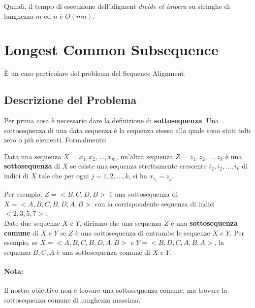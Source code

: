 Quindi, il tempo di esecuzione dell'aligment \emph{divide et impera} su
stringhe di lunghezza $m$ ed $n$ è $O(mn)$.

\section{Longest Common Subsequence}

È un caso particolare del problema del Sequence Alignment.

\subsection{Descrizione del Problema}

Per prima cosa è necessario dare la definizione di
\textbf{sottosequenza}. Una sottosequenza di una data sequenza è la
sequenza stessa alla quale sono stati tolti zero o più elementi.
Formalmente:\\

\begin{minipage}{\textwidth}
	\begin{myblockquote}
		Data una sequenza $X$ =
		$x_1, x_2, ..., x_m$, un'altra sequenza $Z$ = $z_1, z_2, ..., z_k$
		è una \textbf{sottosequenza} di $X$ se esiste una sequenza
		strettamente crescente $i_2, i_2, ..., i_k$ di indici di $X$ tale
		che per ogni $j = 1, 2, ..., k$, si ha $x_{i_j} = z_j$.
	\end{myblockquote}
\end{minipage}

Per esempio, $Z = <B, C, D, B>$ è una sottosequenza di
$X = < A, B, C, B, D, A, B>$ con la corrispondente sequenza di indici
$<2, 3, 5, 7>$.\\

Date due sequenze $X$ e $Y$, diciamo che una sequenza $Z$ è una
\textbf{sottosequenza comune} di $X$ e $Y$ se $Z$ è una
sottosequenza di entrambe le sequenze $X$ e $Y$. Per esempio, se
$X = <A,B,C,B,D,A,B>$ e $Y = <B,D,C,A,B,A>$, la sequenza $B,C,A$ è
una sottosequenza comune di $X$ e $Y$.

\paragraph*{Nota:} Il nostro obiettivo non è trovare una
sottosequenza comune, ma trovare la sottosequenza comune di lunghezza
massima.


